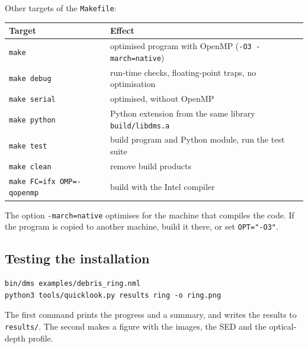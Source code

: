 \documentclass[11pt,a4paper]{article}
\newcommand{\code}[1]{\texttt{#1}}
\begin{document}
Other targets of the \code{Makefile}:

\begin{center}
\small
\begin{tabular}{@{}ll@{}}
\toprule
Target & Effect \\
\midrule
\code{make} & optimised program with OpenMP (\code{-O3 -march=native}) \\
\code{make debug} & run-time checks, floating-point traps, no optimisation \\
\code{make serial} & optimised, without OpenMP \\
\code{make python} & Python extension from the same library \code{build/libdms.a} \\
\code{make test} & build program and Python module, run the test suite \\
\code{make clean} & remove build products \\
\code{make FC=ifx OMP=-qopenmp} & build with the Intel compiler \\
\bottomrule
\end{tabular}
\end{center}

The option \code{-march=native} optimises for the machine that compiles the code. If the
program is copied to another machine, build it there, or set \code{OPT="-O3"}.

\subsection{Testing the installation}
\label{sec:tests}

\begin{lstlisting}[style=sh]
bin/dms examples/debris_ring.nml
python3 tools/quicklook.py results ring -o ring.png
\end{lstlisting}
The first command prints the progress and a summary, and writes the results to \code{results/}.
The second makes a figure with the images, the SED and the optical-depth profile.
\end{document}
